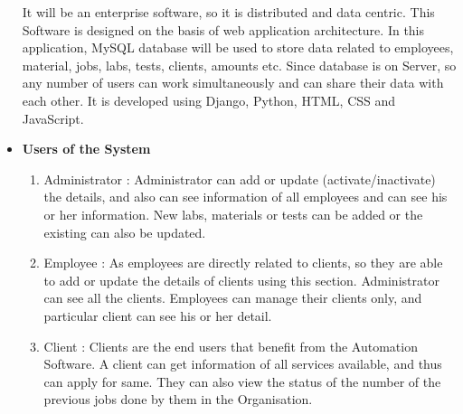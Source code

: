 \begin{itemize}
It will be an enterprise software, so it is distributed and data centric. 
This Software is designed on the basis of web application architecture. 
In this application, MySQL database will be used to store data related 
to employees, material, jobs, labs, tests, clients, amounts etc. Since 
database is on Server, so any number of users can work simultaneously 
and can share their data with each other. It is developed using Django, 
Python, HTML, CSS and JavaScript.
\item{\bf Users of the System}
\begin{enumerate} 
\item Administrator : Administrator can add or update 
(activate/inactivate) the details, and also can see information of all 
employees and can see his or her information. New labs, materials or 
tests can be added or the existing can also be updated.
\item Employee : As employees are directly related to clients, so they 
are able to add or update the details of clients using this section. 
Administrator can see all the clients. Employees can manage their 
clients only, and particular client can see his or her detail.
\item Client : Clients are the end users that benefit from the 
Automation Software. A client can get information of all services 
available, and thus can apply for same. They can also view the status 
of the number of the previous jobs done by them in the Organisation.
\end{enumerate}
\end{itemize}
